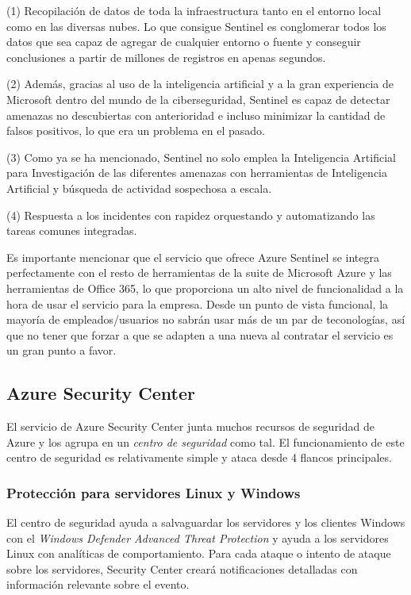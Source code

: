 \documentclass{article}
\begin{document}
(1) Recopilación de datos de toda la infraestructura tanto en el entorno local
como en las diversas nubes. Lo que consigue Sentinel es conglomerar todos los
datos que sea capaz de agregar de cualquier entorno o fuente y conseguir
conclusiones a partir de millones de registros en apenas segundos. 

(2) Además, gracias al uso de la inteligencia artificial y a la
gran experiencia de Microsoft dentro del mundo de la ciberseguridad, Sentinel es
capaz de detectar amenazas no descubiertas con anterioridad e incluso minimizar
la cantidad de falsos positivos, lo que era un problema en el pasado.

(3) Como ya se ha mencionado, Sentinel no solo emplea la Inteligencia Artificial
para Investigación de las diferentes amenazas con herramientas de Inteligencia
Artificial y búsqueda de actividad sospechosa a escala.

(4) Respuesta a los incidentes con rapidez orquestando y automatizando las
tareas comunes integradas.

Es importante mencionar que el servicio que ofrece Azure Sentinel se integra
perfectamente con el resto de herramientas de la suite de Microsoft Azure y las
herramientas de Office 365, lo que proporciona un alto nivel de funcionalidad a
la hora de usar el servicio para la empresa. Desde un punto de vista
funcional, la mayoría de empleados/usuarios no sabrán usar más de un par de
teconologías, así que no tener que forzar a que se adapten a una nueva al
contratar el servicio es un gran punto a favor.

\subsection*{Azure Security Center}

El servicio de Azure Security Center junta muchos recursos de seguridad de Azure
y los agrupa en un \textit{centro de seguridad} como tal. El funcionamiento de
este centro de seguridad es relativamente simple y ataca desde 4 flancos
principales.

\subsubsection*{Protección para servidores Linux y Windows}
El centro de seguridad ayuda a salvaguardar los servidores y los clientes
Windows con el \textit{Windows Defender Advanced Threat Protection} y ayuda a
los servidores Linux con analíticas de comportamiento. Para cada ataque o
intento de ataque sobre los servidores, Security Center creará notificaciones
detalladas con información relevante sobre el evento.
\end{document}
